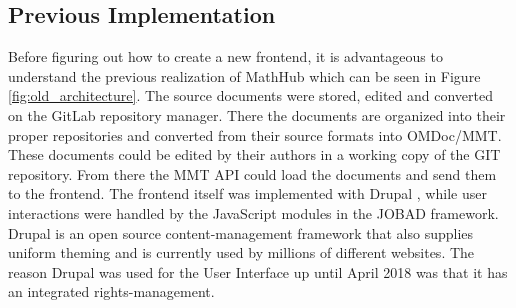 \documentclass[11pt,a4paper]{article}
\begin{document}
\subsection{Previous Implementation} \label{previous}
Before figuring out how to create a new frontend, it is advantageous to understand the previous realization of MathHub which can be seen in Figure \ref{fig:old_architecture}.
The source documents were stored, edited and converted on the GitLab repository manager.
There the documents are organized into their proper repositories and converted from their source formats into OMDoc/MMT.
These documents could be edited by their authors in a working copy of the GIT repository.
From there the MMT API could load the documents and send them to the frontend.
The frontend itself was implemented with Drupal \cite{comp}, while user interactions were handled by the JavaScript modules in the JOBAD framework.
Drupal is an open source content-management framework that also supplies uniform theming and is currently used by millions of different websites.
The reason Drupal was used for the User Interface up until April 2018 was that it has an integrated rights-management.
\end{document}

